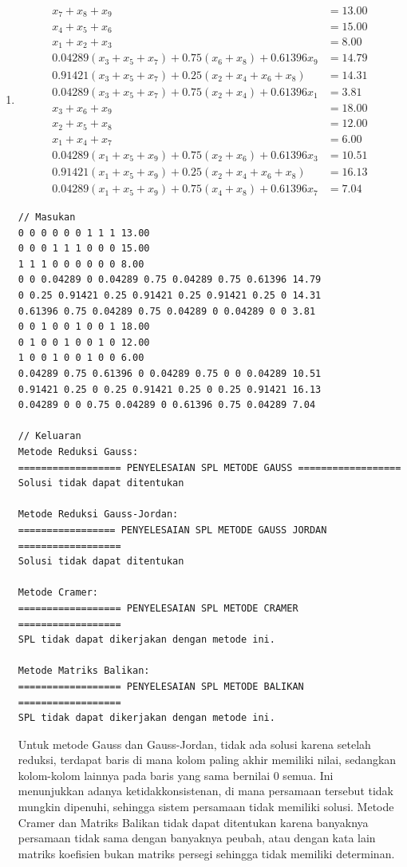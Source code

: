 \begin{enumerate}[label=(\alph*)]
\pagebreak
    \item
\begin{align*}
    x_7 + x_8 + x_9 &= 13.00 \\
    x_4 + x_5 + x_6 &= 15.00 \\
    x_1 + x_2 + x_3 &= 8.00 \\
    0.04289(x_3 + x_5 + x_7) + 0.75(x_6 + x_8) + 0.61396x_9 &= 14.79 \\
    0.91421(x_3 + x_5 + x_7) + 0.25(x_2 + x_4 + x_6 + x_8) &= 14.31 \\
    0.04289(x_3 + x_5 + x_7) + 0.75(x_2 + x_4) + 0.61396x_1 &= 3.81 \\
    x_3 + x_6 + x_9 &= 18.00 \\
    x_2 + x_5 + x_8 &= 12.00 \\
    x_1 + x_4 + x_7 &= 6.00 \\
    0.04289(x_1 + x_5 + x_9) + 0.75(x_2 + x_6) + 0.61396x_3 &= 10.51\\
    0.91421(x_1 + x_5 + x_9) + 0.25(x_2 + x_4 + x_6 + x_8) &= 16.13 \\
    0.04289(x_1 + x_5 + x_9) + 0.75(x_4 + x_8) + 0.61396x_7 &= 7.04
\end{align*}

\begin{lstlisting}[caption = spl-3b.txt]
// Masukan
0 0 0 0 0 0 1 1 1 13.00
0 0 0 1 1 1 0 0 0 15.00
1 1 1 0 0 0 0 0 0 8.00
0 0 0.04289 0 0.04289 0.75 0.04289 0.75 0.61396 14.79
0 0.25 0.91421 0.25 0.91421 0.25 0.91421 0.25 0 14.31
0.61396 0.75 0.04289 0.75 0.04289 0 0.04289 0 0 3.81
0 0 1 0 0 1 0 0 1 18.00
0 1 0 0 1 0 0 1 0 12.00
1 0 0 1 0 0 1 0 0 6.00
0.04289 0.75 0.61396 0 0.04289 0.75 0 0 0.04289 10.51
0.91421 0.25 0 0.25 0.91421 0.25 0 0.25 0.91421 16.13
0.04289 0 0 0.75 0.04289 0 0.61396 0.75 0.04289 7.04

// Keluaran
Metode Reduksi Gauss:
================== PENYELESAIAN SPL METODE GAUSS ==================
Solusi tidak dapat ditentukan

Metode Reduksi Gauss-Jordan:
================= PENYELESAIAN SPL METODE GAUSS JORDAN ==================
Solusi tidak dapat ditentukan

Metode Cramer:
================== PENYELESAIAN SPL METODE CRAMER ==================
SPL tidak dapat dikerjakan dengan metode ini.

Metode Matriks Balikan:
================== PENYELESAIAN SPL METODE BALIKAN ==================
SPL tidak dapat dikerjakan dengan metode ini.\end{lstlisting}

Untuk metode Gauss dan Gauss-Jordan, tidak ada solusi karena setelah reduksi, terdapat baris di mana kolom paling akhir memiliki nilai, sedangkan kolom-kolom lainnya pada baris yang sama bernilai 0 semua. Ini menunjukkan adanya ketidakkonsistenan, di mana persamaan tersebut tidak mungkin dipenuhi, sehingga sistem persamaan tidak memiliki solusi. Metode Cramer dan Matriks Balikan tidak dapat ditentukan karena banyaknya persamaan tidak sama dengan banyaknya peubah, atau dengan kata lain matriks koefisien bukan matriks persegi sehingga tidak memiliki determinan.

\end{enumerate}
\pagebreak
